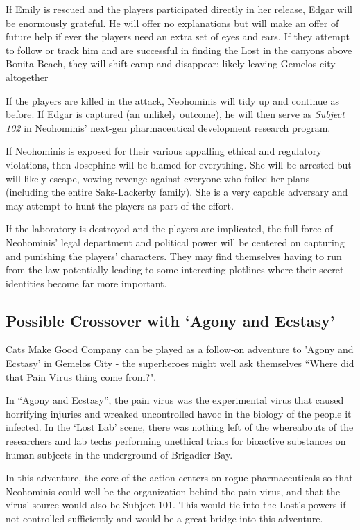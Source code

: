 \documentclass[letterpaper,serif]{rpg-module}
\begin{document}
If Emily is rescued and the players participated directly in her release, Edgar will be enormously grateful. He will offer no explanations but will make an offer of future help if ever the players need an extra set of eyes and ears. If they attempt to follow or track him and are successful in finding the Lost in the canyons above Bonita Beach, they will shift camp and disappear; likely leaving Gemelos city altogether

If the players are killed in the attack, Neohominis will tidy up and continue as before. If Edgar is captured (an unlikely outcome), he will then serve as \emph{Subject 102} in Neohominis' next-gen pharmaceutical development research program. 

If Neohominis is exposed for their various appalling ethical and regulatory violations, then Josephine will be blamed for everything. She will be arrested but will likely escape, vowing revenge against everyone who foiled her plans (including the entire Saks-Lackerby family). She is a very capable adversary and may attempt to hunt the players as part of the effort. 

If the laboratory is destroyed and the players are implicated, the full force of Neohominis' legal department and political power will be centered on capturing and punishing the players' characters. They may find themselves having to run from the law potentially leading to some interesting plotlines where their secret identities become far more important. 

\begin{boxtext}
\section{Possible Crossover with `Agony and Ecstasy'}
Cats Make Good Company can be played as a follow-on adventure to 'Agony and Ecstasy' in Gemelos City - the superheroes might well ask themselves ``Where did that Pain Virus thing come from?".      

In ``Agony and Ecstasy'', the pain virus was the experimental virus that caused horrifying injuries and wreaked uncontrolled havoc in the biology of the people it infected. In the `Lost Lab' scene, there was nothing left of the whereabouts of the researchers and lab techs performing unethical trials for bioactive substances on human subjects in the underground of Brigadier Bay.  

In this adventure, the core of the action centers on rogue pharmaceuticals so that Neohominis could well be the organization behind the pain virus, and that the virus' source would also be Subject 101. This would tie into the Lost's powers if not controlled sufficiently and would be a great bridge into this adventure.   
\end{boxtext}
\end{document}
